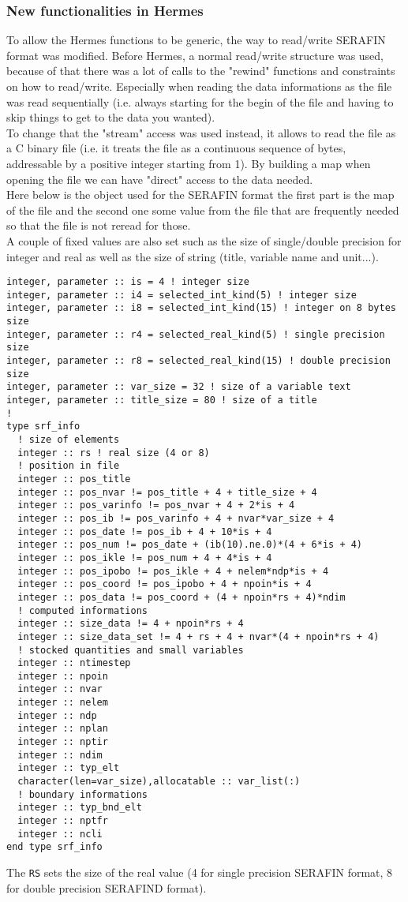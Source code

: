 %
\subsubsection{New functionalities in Hermes}
%
To allow the Hermes functions to be generic, the way to read/write SERAFIN
format was modified. Before Hermes, a normal read/write structure was used,
because of that there was a lot of calls to the "rewind" functions and
constraints on how to read/write. Especially when reading the data informations
as the file was read sequentially (i.e. always starting for the begin of the
file and having to skip things to get to the data you wanted).\\
%
To change that the "stream" access was used instead, it allows to read the file
as a C binary file (i.e. it treats the file as a continuous sequence of bytes,
addressable by a positive integer starting from 1). By building a map when
opening the file we can have "direct" access to the data needed.\\
%
Here below is the object used for the SERAFIN format the first part is the map
of the file and the second one some value from the file that are frequently
needed so that the file is not reread for those.\\
%
A couple of fixed values are also set such as the size of single/double
precision for integer and real as well as the size of string (title, variable
name and unit...).
%
\begin{lstlisting}
integer, parameter :: is = 4 ! integer size
integer, parameter :: i4 = selected_int_kind(5) ! integer size
integer, parameter :: i8 = selected_int_kind(15) ! integer on 8 bytes size
integer, parameter :: r4 = selected_real_kind(5) ! single precision size
integer, parameter :: r8 = selected_real_kind(15) ! double precision size
integer, parameter :: var_size = 32 ! size of a variable text
integer, parameter :: title_size = 80 ! size of a title
!
type srf_info
  ! size of elements
  integer :: rs ! real size (4 or 8)
  ! position in file
  integer :: pos_title
  integer :: pos_nvar != pos_title + 4 + title_size + 4
  integer :: pos_varinfo != pos_nvar + 4 + 2*is + 4
  integer :: pos_ib != pos_varinfo + 4 + nvar*var_size + 4
  integer :: pos_date != pos_ib + 4 + 10*is + 4
  integer :: pos_num != pos_date + (ib(10).ne.0)*(4 + 6*is + 4)
  integer :: pos_ikle != pos_num + 4 + 4*is + 4
  integer :: pos_ipobo != pos_ikle + 4 + nelem*ndp*is + 4
  integer :: pos_coord != pos_ipobo + 4 + npoin*is + 4
  integer :: pos_data != pos_coord + (4 + npoin*rs + 4)*ndim
  ! computed informations
  integer :: size_data != 4 + npoin*rs + 4
  integer :: size_data_set != 4 + rs + 4 + nvar*(4 + npoin*rs + 4)
  ! stocked quantities and small variables
  integer :: ntimestep
  integer :: npoin
  integer :: nvar
  integer :: nelem
  integer :: ndp
  integer :: nplan
  integer :: nptir
  integer :: ndim
  integer :: typ_elt
  character(len=var_size),allocatable :: var_list(:)
  ! boundary informations
  integer :: typ_bnd_elt
  integer :: nptfr
  integer :: ncli
end type srf_info
\end{lstlisting}
%
The \verb!RS! sets the size of the real value (4 for single precision SERAFIN
format, 8 for double precision SERAFIND format).
%

